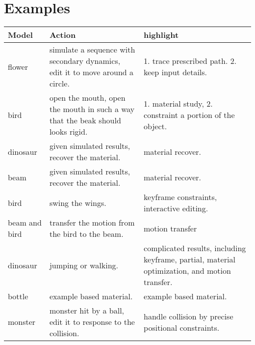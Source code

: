\documentclass[9pt]{extarticle}
\begin{document}
\section{Examples}
\begin{center}
    \begin{longtable}{ | p{1.7cm} | p{8.0cm} | p{8.0cm}|}
    \hline
    Model & Action & highlight \\ \hline 

    flower& simulate a sequence with secondary dynamics, edit it to move around
    a circle. & 1. trace prescribed path. 2. keep input details. \\ \hline

    bird & open the mouth, open the mouth in such a way that the beak should
    looks rigid. & 1. material study, 2. constraint a portion of the object.\\
    \hline

    dinosaur & given simulated results, recover the material. & material recover. \\ \hline

    beam & given simulated results, recover the material. & material recover. \\ \hline

    bird & swing the wings. & keyframe constraints, interactive editing. \\
    \hline

    beam and bird & transfer the motion from the bird to the beam. & motion
    transfer \\ \hline

    dinosaur & jumping or walking. & complicated results, including keyframe,
    partial, material optimization, and motion transfer. \\ \hline

    bottle & example based material. & example based material.  \\ \hline

    monster & monster hit by a ball, edit it to response to the collision. &
    handle collision by precise positional constraints.  \\ \hline



\end{longtable}
\end{center}
\end{document}
